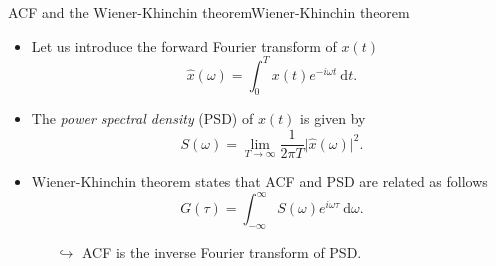 \documentclass[usenames,dvipsnames,svgnames,10pt,aspectratio=169]{beamer}
\begin{document}
\begin{frame}[t, c]{ACF and the Wiener-Khinchin theorem}{Wiener-Khinchin theorem}
	\begin{itemize}
		\item Let us introduce the forward Fourier transform of $x(t)$
		$$
		\hat{x}(\omega) = \int_0^T x(t) e^{-i \omega t} \ \mathrm{d}t.
		$$

		\item The \emph{power spectral density} (PSD) of $x(t)$ is given by
		$$
		S(\omega) = \lim_{T \to \infty} \frac{1}{2\pi T} \vert \hat{x}(\omega) \vert^2.
		$$

		\item Wiener-Khinchin theorem states that ACF and PSD are related as follows
		$$
		G(\tau) = \int_{-\infty}^{\infty} S(\omega) e^{i \omega \tau} \ \mathrm{d}\omega.
		$$
		\begin{itemize}
			\item[$\hookrightarrow$] ACF is the inverse Fourier transform of PSD.
		\end{itemize}
	\end{itemize}

	\vspace{1cm}
\end{frame}
\end{document}
